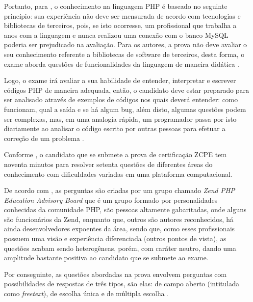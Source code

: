 Portanto, para , o
conhecimento na linguagem \acs{PHP} é baseado no seguinte princípio: sua
experiência não deve ser mensurada de acordo com tecnologias
e bibliotecas de terceiros, pois, se isto ocorresse, um profissional que
trabalha a anos com a linguagem e nunca realizou uma conexão com o banco
\acs{MySQL} poderia ser prejudicado na avaliação. Para os autores, a
prova não deve avaliar o seu conhecimento referente a bibliotecas de software
de terceiros, desta forma, o exame aborda questões de funcionalidades da
linguagem  de maneira didática \cite{theZendPHPCertificationPracticeTestBook}.

Logo, o exame irá avaliar a sua habilidade de
entender, interpretar e escrever códigos \acs{PHP} de maneira adequada, então,
o candidato deve estar preparado para ser analisado através de exemplos de
códigos nos quais deverá entender: como funcionam, qual a saída e se há algum \acs{bug},
além disto, algumas questões podem ser complexas, mas, em uma analogia rápida,
um programador passa por isto diariamente ao analisar o código escrito por
outras pessoas para efetuar a correção de um problema
\cite{theZendPHPCertificationPracticeTestBook}.

Conforme , o candidato que
se submete a prova de certificação \acs{ZCPE} tem noventa minutos para resolver
setenta questões de diferentes áreas do conhecimento com dificuldades variadas
em uma plataforma computacional.

De acordo com , as perguntas são criadas por
um grupo chamado \textit{Zend PHP Education Advisory Board} que é um grupo formado por
personalidades conhecidas da comunidade \acs{PHP}, são pessoas altamente
gabaritadas, onde alguns são funcionários da \acs{Zend}, enquanto que, outros são autores
reconhecidos,  há ainda desenvolvedores expoentes da área, sendo que, como esses
profissionais possuem uma visão e experiência diferenciada (outros pontos de
vista), as questões acabam sendo heterogêneas, porém, com caráter neutro, dando
uma amplitude bastante positiva ao candidato que se submete ao exame.

Por conseguinte, as questões abordadas na prova envolvem perguntas com
possibilidades de respostas de três tipos, são elas: de campo aberto (intitulada
como \textit{freetext}), de escolha única e de múltipla escolha
\cite{entrevistaAriZCEBrasil}.

